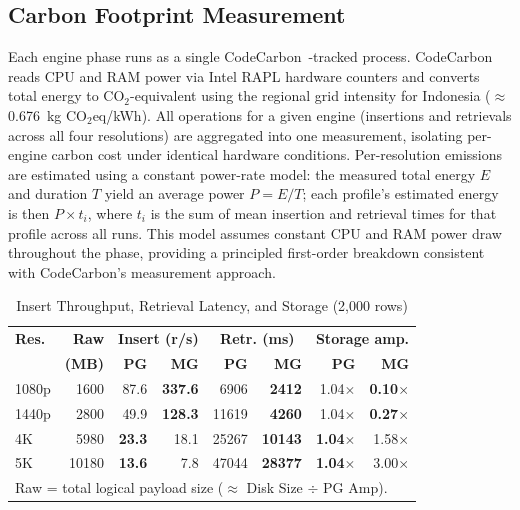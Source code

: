 \documentclass[conference]{IEEEtran}
\begin{document}
\subsection{Carbon Footprint Measurement}
Each engine phase runs as a single CodeCarbon~\cite{codecarbon}-tracked process. CodeCarbon reads CPU and RAM power via Intel RAPL hardware counters and converts total energy to CO$_2$-equivalent using the regional grid intensity for Indonesia ($\approx$0.676~kg CO$_2$eq/kWh). All operations for a given engine (insertions and retrievals across all four resolutions) are aggregated into one measurement, isolating per-engine carbon cost under identical hardware conditions. Per-resolution emissions are estimated using a constant power-rate model: the measured total energy $E$ and duration $T$ yield an average power $P = E/T$; each profile's estimated energy is then $P \times t_i$, where $t_i$ is the sum of mean insertion and retrieval times for that profile across all runs. This model assumes constant CPU and RAM power draw throughout the phase, providing a principled first-order breakdown consistent with CodeCarbon's measurement approach.


\begin{table}[htbp]
\centering
\renewcommand{\arraystretch}{1.1}
\caption{Insert Throughput, Retrieval Latency, and Storage (2,000 rows)}
\label{tab:performance_summary}
\begin{tabular}{l r r r r r r r}
\hline
\textbf{Res.} & \textbf{Raw} & \multicolumn{2}{c}{\textbf{Insert (r/s)}} & \multicolumn{2}{c}{\textbf{Retr. (ms)}} & \multicolumn{2}{c}{\textbf{Storage amp.}} \\
 & \textbf{(MB)} & \textbf{PG} & \textbf{MG} & \textbf{PG} & \textbf{MG} & \textbf{PG} & \textbf{MG} \\
\hline
1080p & 1600 & 87.6  & \textbf{337.6} & 6906  & \textbf{2412}  & 1.04$\times$ & \textbf{0.10$\times$} \\
1440p & 2800 & 49.9  & \textbf{128.3} & 11619 & \textbf{4260}  & 1.04$\times$ & \textbf{0.27$\times$} \\
4K    & 5980 & \textbf{23.3} & 18.1  & 25267 & \textbf{10143} & \textbf{1.04$\times$} & 1.58$\times$ \\
5K    & 10180 & \textbf{13.6} & 7.8   & 47044 & \textbf{28377} & \textbf{1.04$\times$} & 3.00$\times$ \\
\hline
\multicolumn{8}{l}{\footnotesize Raw = total logical payload size ($\approx$ Disk Size $\div$ PG Amp).}
\end{tabular}
\end{table}
\end{document}
